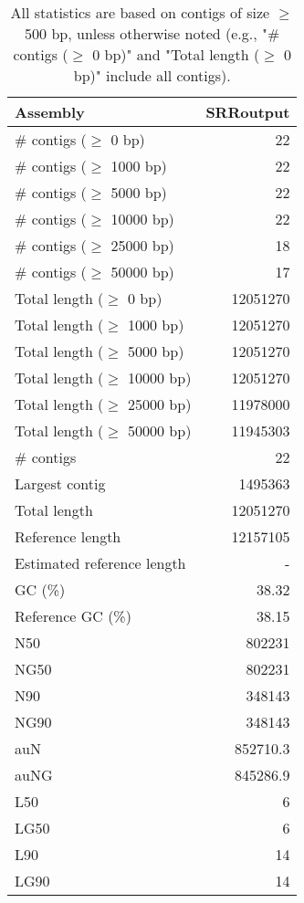 \documentclass[12pt,a4paper]{article}
\begin{document}
\begin{table}[ht]
\begin{center}
\caption{All statistics are based on contigs of size $\geq$ 500 bp, unless otherwise noted (e.g., "\# contigs ($\geq$ 0 bp)" and "Total length ($\geq$ 0 bp)" include all contigs).}
\begin{tabular}{|l*{1}{|r}|}
\hline
Assembly & SRRoutput \\ \hline
\# contigs ($\geq$ 0 bp) & 22 \\ \hline
\# contigs ($\geq$ 1000 bp) & 22 \\ \hline
\# contigs ($\geq$ 5000 bp) & 22 \\ \hline
\# contigs ($\geq$ 10000 bp) & 22 \\ \hline
\# contigs ($\geq$ 25000 bp) & 18 \\ \hline
\# contigs ($\geq$ 50000 bp) & 17 \\ \hline
Total length ($\geq$ 0 bp) & 12051270 \\ \hline
Total length ($\geq$ 1000 bp) & 12051270 \\ \hline
Total length ($\geq$ 5000 bp) & 12051270 \\ \hline
Total length ($\geq$ 10000 bp) & 12051270 \\ \hline
Total length ($\geq$ 25000 bp) & 11978000 \\ \hline
Total length ($\geq$ 50000 bp) & 11945303 \\ \hline
\# contigs & 22 \\ \hline
Largest contig & 1495363 \\ \hline
Total length & 12051270 \\ \hline
Reference length & 12157105 \\ \hline
Estimated reference length & - \\ \hline
GC (\%) & 38.32 \\ \hline
Reference GC (\%) & 38.15 \\ \hline
N50 & 802231 \\ \hline
NG50 & 802231 \\ \hline
N90 & 348143 \\ \hline
NG90 & 348143 \\ \hline
auN & 852710.3 \\ \hline
auNG & 845286.9 \\ \hline
L50 & 6 \\ \hline
LG50 & 6 \\ \hline
L90 & 14 \\ \hline
LG90 & 14 \\ \hline

\end{tabular}
\end{center}
\end{table}
\end{document}
